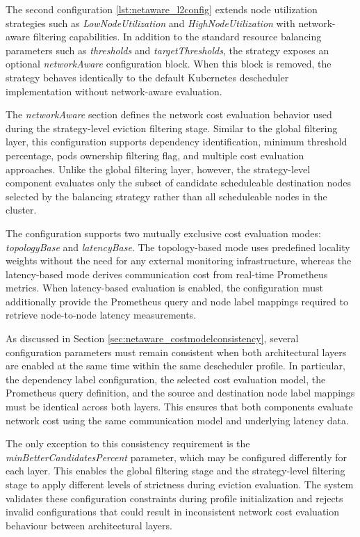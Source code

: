 

The second configuration \ref{lst:netaware_l2config} extends node utilization strategies such as \textit{LowNodeUtilization} and \textit{HighNodeUtilization} with network-aware filtering capabilities. In addition to the standard resource balancing parameters such as \textit{thresholds} and \textit{targetThresholds}, the strategy exposes an optional \textit{networkAware} configuration block. When this block is removed, the strategy behaves identically to the default Kubernetes descheduler implementation without network-aware evaluation.

The \textit{networkAware} section defines the network cost evaluation behavior used during the strategy-level eviction filtering stage. Similar to the global filtering layer, this configuration supports dependency identification, minimum threshold percentage, pods ownership filtering flag, and multiple cost evaluation approaches. Unlike the global filtering layer, however, the strategy-level component evaluates only the subset of candidate scheduleable destination nodes selected by the balancing strategy rather than all scheduleable nodes in the cluster.

The configuration supports two mutually exclusive cost evaluation modes: \textit{topologyBase} and \textit{latencyBase}. The topology-based mode uses predefined locality weights without the need for any external monitoring infrastructure, whereas the latency-based mode derives communication cost from real-time Prometheus metrics. When latency-based evaluation is enabled, the configuration must additionally provide the Prometheus query and node label mappings required to retrieve node-to-node latency measurements.

As discussed in Section \ref{sec:netaware_costmodelconsistency}, several configuration parameters must remain consistent when both architectural layers are enabled at the same time within the same descheduler profile. In particular, the dependency label configuration, the selected cost evaluation model, the Prometheus query definition, and the source and destination node label mappings must be identical across both layers. This ensures that both components evaluate network cost using the same communication model and underlying latency data.

The only exception to this consistency requirement is the \textit{minBetterCandidatesPercent} parameter, which may be configured differently for each layer. This enables the global filtering stage and the strategy-level filtering stage to apply different levels of strictness during eviction evaluation. The system validates these configuration constraints during profile initialization and rejects invalid configurations that could result in inconsistent network cost evaluation behaviour between architectural layers.
